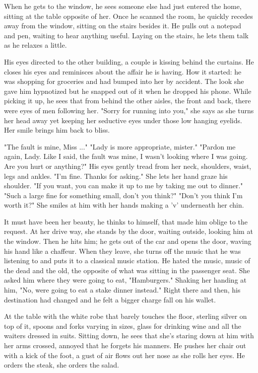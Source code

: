         When he gets to the window, he sees someone else had just entered the home, sitting at the table opposite of her. Once he scanned the
    room, he quickly recedes away from the window, sitting on the stairs besides it. He pulls out a notepad and pen, waiting to hear anything
    useful. Laying on the stairs, he lets them talk as he relaxes a little.

        His eyes directed to the other building, a couple is kissing behind the curtains. He closes his eyes and reminisces about the affair he
    is having. How it started: he was shopping for groceries and had bumped into her by accident. The look she gave him hypnotized but he snapped
    out of it when he dropped his phone. While picking it up, he sees that from behind the other aisles, the front and back, there were eyes of
    men following her. "Sorry for running into you," she says as she turns her head away yet keeping her seductive eyes under those low hanging
    eyelids. Her smile brings him back to bliss.

        "The fault is mine, Miss ..." "Lady is more appropriate, mister." "Pardon me again, Lady. Like I said, the fault was mine, I wasn't 
    looking where I was going. Are you hurt or anything?" His eyes gently tread from her neck, shoulders, waist, legs and ankles. "I'm fine.
    Thanks for asking." She lets her hand graze his shoulder. "If you want, you can make it up to me by taking me out to dinner." "Such a large
    fine for something small, don't you think?" "Don't you think I'm worth it?" She smiles at him with her hands making a 'v' underneath her
    chin.

       It must have been her beauty, he thinks to himself, that made him oblige to the request. At her drive way, she stands by the door, waiting
    outside, looking him at the window. Then he hits him; he gets out of the car and opens the door, waving his hand like a chaffeur. When they 
    leave, she turns off the music that he was listening to and puts it to a classical music station. He hated the music, music of the dead
    and the old, the opposite of what was sitting in the passenger seat. She asked him where they were going to eat, "Hamburgers." Shaking her
    handing at him, "No, were going to eat a stake dinner instead." Right there and then, his destination had changed and he felt a bigger charge
    fall on his wallet.

        At the table with the white robe that barely touches the floor, sterling silver on top of it, spoons and forks varying in sizes, glass
    for drinking wine and all the waiters dressed in suits. Sitting down, he sees that she's staring down at him with her arms crossed, annoyed
    that he forgets his manners. He pushes her chair out with a kick of the foot, a gust of air flows out her nose as she rolls her eyes. He
    orders the steak, she orders the salad. 

